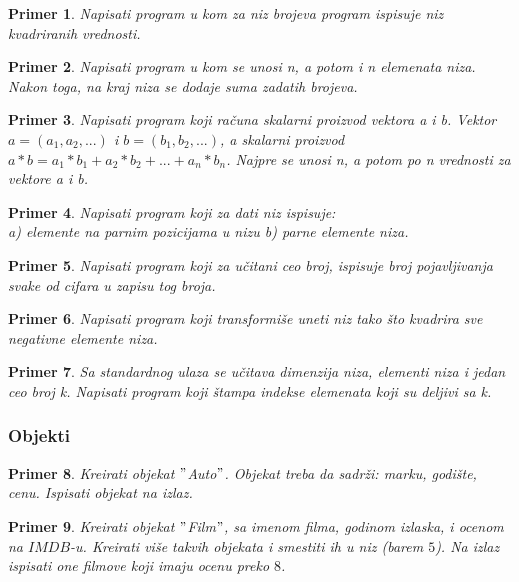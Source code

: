 \documentclass[a4paper]{article}
\newtheorem{primer}{Primer}[section]
\begin{document}
\begin{primer}
Napisati program u kom za niz brojeva program ispisuje niz kvadriranih vrednosti.
\end{primer}

\begin{primer}
Napisati program u kom se unosi n, a potom i n elemenata niza. Nakon toga, na kraj niza se dodaje suma zadatih brojeva.
\end{primer}

\begin{primer}
Napisati program koji računa skalarni proizvod vektora a i b. Vektor $a=(a_1, a_2,...)$ i $b=(b_1, b_2,...)$, a skalarni proizvod $a*b= a_1 * b_1 + a_2 * b_2 + ... + a_n * b_n$. Najpre se unosi n, a potom po n vrednosti za vektore a i b. 
\end{primer}

\begin{primer}
Napisati program koji za dati niz ispisuje:\\
a) elemente na parnim pozicijama u nizu
b) parne elemente niza.
\end{primer}

\begin{primer}
Napisati program koji za učitani ceo broj, ispisuje broj
pojavljivanja svake od cifara u zapisu tog broja.
\end{primer}


\begin{primer}
Napisati program koji transformiše uneti niz tako što
kvadrira sve negativne elemente niza. 
\end{primer}

\begin{primer}
Sa standardnog ulaza se učitava dimenzija niza, elementi
niza i jedan ceo broj k. Napisati program koji štampa indekse elemenata koji su
deljivi sa k.
\end{primer}

\subsubsection{Objekti}
\begin{primer}
Kreirati objekat $"$Auto$"$. Objekat treba da sadrži: marku, godište, cenu.
Ispisati objekat na izlaz.
\end{primer}

\begin{primer}
Kreirati objekat $"$Film$"$, sa imenom filma, godinom izlaska, i ocenom na $IMDB$-u. Kreirati više takvih objekata i smestiti ih u niz (barem $5$). Na izlaz ispisati one filmove koji imaju ocenu preko $8$.  
\end{primer}
\end{document}
